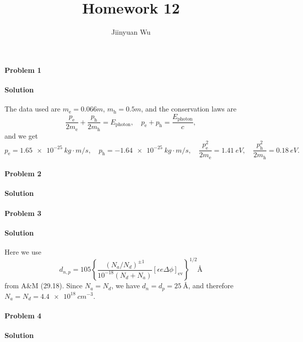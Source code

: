 \documentclass[hyperref, a4paper]{article}
\title{Homework 12}
\author{Jiinyuan Wu}
\begin{document}
    
\maketitle

\paragraph{Problem 1} 

\paragraph{Solution} The data used are $m_{\text{e}} = 0.066m$, 
$m_{\text{h}} = 0.5 m$,
and the conservation laws are 
\begin{equation}
    \frac{p_{\text{e}}}{2m_{\text{e}}} + \frac{p_{\text{h}}}{2m_{\text{h}}} = E_{\text{photon}}, \quad 
    p_{\text{e}} + p_{\text{h}} = \frac{E_{\text{photon}}}{c} ,
\end{equation}
and we get 
\begin{equation}
    p_{\text{e}} = \SI{1.65e-25}{kg \cdot m/s}, \quad 
    p_{\text{h}} = \SI{-1.64e-25}{kg \cdot m/s}, \quad 
    \frac{p_{\text{e}}^2}{2m_{\text{e}}} = \SI{1.41}{eV}, \quad 
    \frac{p_{\text{h}}^2}{2m_{\text{h}}} = \SI{0.18}{eV}.
\end{equation}

\paragraph{Problem 2}

\paragraph{Solution} 

\paragraph{Problem 3}

\paragraph{Solution} Here we use 
\begin{equation}
    d_{n, p}=105\left\{\frac{\left(N_a / N_d\right)^{\pm 1}}{10^{-18}\left(N_d+N_a\right)}[\epsilon e \Delta \phi]_\text{ev}\right\}^{1 / 2} \unit{\angstrom}
\end{equation}
from A\&M (29.18).
Since $N_a = N_d$, we have $d_n = d_p = \SI{25}{\angstrom}$,
and therefore $N_a = N_d = \SI{4.4e18}{cm^{-3}}$.

\paragraph{Problem 4}

\paragraph{Solution} 
\end{document}
